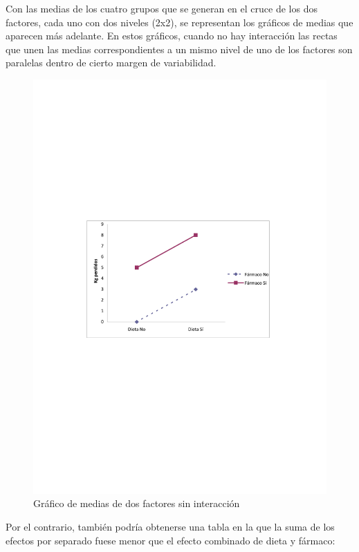 \documentclass[
  a4paper,
]{scrreport}
\theoremstyle{plain}
\theoremstyle{definition}
\theoremstyle{definition}
\theoremstyle{remark}
\begin{document}
Con las medias de los cuatro grupos que se generan en el cruce de los
dos factores, cada uno con dos niveles (2x2), se representan los
gráficos de medias que aparecen más adelante. En estos gráficos, cuando
no hay interacción las rectas que unen las medias correspondientes a un
mismo nivel de uno de los factores son paralelas dentro de cierto margen
de variabilidad.

\begin{figure}[H]

{\centering \includegraphics{img/anova-ancova/sininteraccion.pdf}

}

\caption{Gráfico de medias de dos factores sin interacción}

\end{figure}%

Por el contrario, también podría obtenerse una tabla en la que la suma
de los efectos por separado fuese menor que el efecto combinado de dieta
y fármaco:
\end{document}
